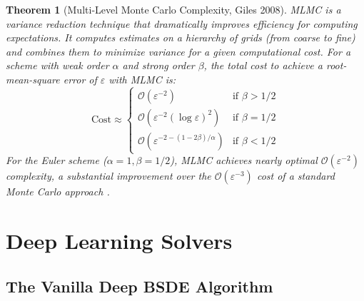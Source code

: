 \documentclass[11pt,letterpaper,oneside]{article}
\theoremstyle{plain}
\newtheorem{theorem}{Theorem}[section]
\theoremstyle{definition}
\theoremstyle{remark}
\begin{document}
\begin{theorem}[Multi-Level Monte Carlo Complexity, Giles 2008]
\label{thm:mlmc}
MLMC is a variance reduction technique that dramatically improves efficiency for computing expectations. It computes estimates on a hierarchy of grids (from coarse to fine) and combines them to minimize variance for a given computational cost. For a scheme with weak order \(\alpha\) and strong order \(\beta\), the total cost to achieve a root-mean-square error of \(\varepsilon\) with MLMC is:
\[
\text{Cost} \approx \begin{cases} \mathcal{O}(\varepsilon^{-2}) & \text{if } \beta > 1/2 \\ \mathcal{O}(\varepsilon^{-2}(\log\varepsilon)^2) & \text{if } \beta = 1/2 \\ \mathcal{O}(\varepsilon^{-2-(1-2\beta)/\alpha}) & \text{if } \beta < 1/2 \end{cases}
\]
For the Euler scheme (\(\alpha=1, \beta=1/2\)), MLMC achieves nearly optimal \(\mathcal{O}(\varepsilon^{-2})\) complexity, a substantial improvement over the \(\mathcal{O}(\varepsilon^{-3})\) cost of a standard Monte Carlo approach \cite{Giles2008}.
\end{theorem}

\section{Deep Learning Solvers}
\label{sec:deep_solvers}

\subsection{The Vanilla Deep BSDE Algorithm}
\label{sec:deep_vanilla}
\end{document}
